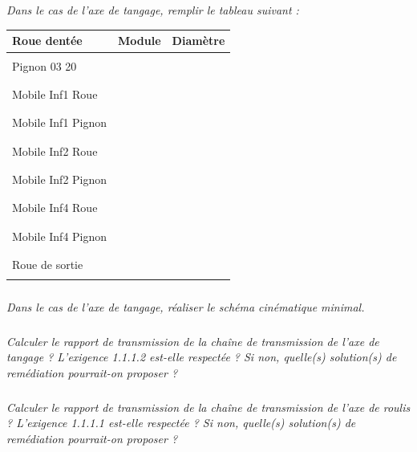\documentclass[10pt]{article}
\begin{document}
\subparagraph{}
\textit{Dans le cas de l'axe de tangage, remplir le tableau suivant :}
\begin{center}
\begin{tabular}{|l|c|c|}
\hline
Roue dentée & Module & Diamètre \\
\hline
& & \\ 
Pignon 03 20 & & \\ 
& & \\ \hline
& & \\ 
Mobile Inf1 Roue & & \\ 
& & \\ \hline
& & \\ 
Mobile Inf1 Pignon & & \\ 
& & \\ \hline
& & \\ 
Mobile Inf2 Roue & & \\ 
& & \\ \hline
& & \\ 
Mobile Inf2 Pignon & & \\ 
& & \\ \hline
& & \\ 
Mobile Inf4 Roue & & \\ 
& & \\ \hline
& & \\ 
Mobile Inf4 Pignon & & \\ 
& & \\ \hline
& & \\ 
Roue de sortie & & \\
& & \\ 
\hline
\end{tabular}
\end{center}


\subparagraph{}
\textit{Dans le cas de l'axe de tangage, réaliser le schéma cinématique minimal.}


\subparagraph{}
\textit{Calculer le rapport de transmission de la chaîne de transmission de l'axe de tangage ? L'exigence 1.1.1.2 est-elle respectée ? Si non, quelle(s) solution(s) de remédiation pourrait-on proposer ?}

\subparagraph{}
\textit{Calculer le rapport de transmission de la chaîne de transmission de l'axe de roulis ? L'exigence 1.1.1.1 est-elle respectée ? Si non, quelle(s) solution(s) de remédiation pourrait-on proposer ?}
\end{document}
